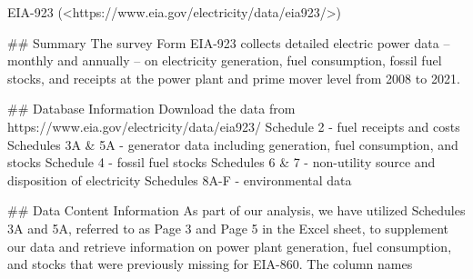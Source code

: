 EIA-923 (<https://www.eia.gov/electricity/data/eia923/>)

## Summary
The survey Form EIA-923 collects detailed electric power data -- monthly and annually -- on electricity generation, fuel consumption, fossil fuel stocks, and receipts at the power plant and prime mover level from 2008 to 2021.

## Database Information
Download the data from https://www.eia.gov/electricity/data/eia923/
Schedule 2 - fuel receipts and costs
Schedules 3A & 5A - generator data including generation, fuel consumption, and stocks
Schedule 4 - fossil fuel stocks
Schedules 6 & 7 - non-utility source and disposition of electricity
Schedules 8A-F - environmental data


## Data Content Information
As part of our analysis, we have utilized Schedules 3A and 5A, referred to as Page 3 and Page 5 in the Excel sheet, to supplement our data and retrieve information on power plant generation, fuel consumption, and stocks that were previously missing for EIA-860. The column names 

